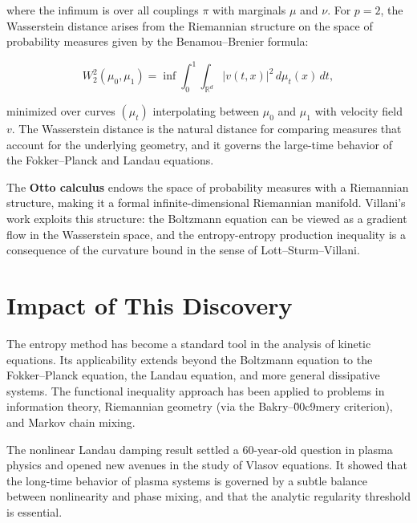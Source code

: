 where the infimum is over all couplings $\pi$ with marginals $\mu$ and $\nu$. For $p=2$, the Wasserstein distance arises from the Riemannian structure on the space of probability measures given by the Benamou--Brenier formula:

\[
W_2^2(\mu_0,\mu_1) = \inf \int_0^1 \int_{\mathbb{R}^d} |v(t,x)|^2 \, d\mu_t(x) \, dt,
\]

minimized over curves $(\mu_t)$ interpolating between $\mu_0$ and $\mu_1$ with velocity field $v$. The Wasserstein distance is the natural distance for comparing measures that account for the underlying geometry, and it governs the large-time behavior of the Fokker--Planck and Landau equations.

The \textbf{Otto calculus} endows the space of probability measures with a Riemannian structure, making it a formal infinite-dimensional Riemannian manifold. Villani's work exploits this structure: the Boltzmann equation can be viewed as a gradient flow in the Wasserstein space, and the entropy-entropy production inequality is a consequence of the curvature bound in the sense of Lott--Sturm--Villani.

\section{Impact of This Discovery}\label{ch2010cedricvillani:impact-of-this-discovery}

The entropy method has become a standard tool in the analysis of kinetic equations. Its applicability extends beyond the Boltzmann equation to the Fokker--Planck equation, the Landau equation, and more general dissipative systems. The functional inequality approach has been applied to problems in information theory, Riemannian geometry (via the Bakry--\u00c9mery criterion), and Markov chain mixing.

The nonlinear Landau damping result settled a 60-year-old question in plasma physics and opened new avenues in the study of Vlasov equations. It showed that the long-time behavior of plasma systems is governed by a subtle balance between nonlinearity and phase mixing, and that the analytic regularity threshold is essential.

